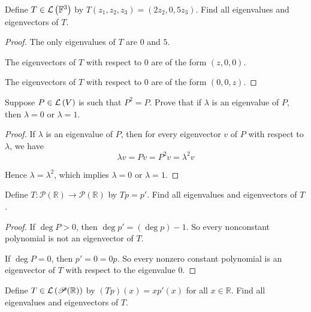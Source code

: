 \begin{exercise}
    Define $T\in\mathcal{L}\left({\mathbb{F}^{3}}\right)$ by $T(z_{1}, z_{2}, z_{3}) = (2z_{2}, 0, 5z_{3})$. Find all eigenvalues and eigenvectors of $T$.
\end{exercise}

\begin{proof}
    The only eigenvalues of $T$ are $0$ and $5$.

    The eigenvectors of $T$ with respect to $0$ are of the form $(z, 0, 0)$.

    The eigenvectors of $T$ with respect to $0$ are of the form $(0, 0, z)$.
\end{proof}
\newpage

\begin{exercise}
    Suppose $P\in\mathcal{L}\left({V}\right)$ is such that $P^{2} = P$. Prove that if $\lambda$ is an eigenvalue of $P$, then $\lambda = 0$ or $\lambda = 1$.
\end{exercise}

\begin{proof}
    If $\lambda$ is an eigenvalue of $P$, then for every eigenvector $v$ of $P$ with respect to $\lambda$, we have
    \[
        \lambda v = Pv = P^{2}v = \lambda^{2}v
    \]

    Hence $\lambda = \lambda^{2}$, which implies $\lambda = 0$ or $\lambda = 1$.
\end{proof}
\newpage

\begin{exercise}
    Define $T: \mathscr{P}(\mathbb{R})\to \mathscr{P}(\mathbb{R})$ by $Tp = p'$. Find all eigenvalues and eigenvectors of $T$.
\end{exercise}

\begin{proof}
    If $\deg P > 0$, then $\deg p' = (\deg p) - 1$. So every nonconstant polynomial is not an eigenvector of $T$.

    If $\deg P = 0$, then $p' = 0 = 0p$. So every nonzero constant polynomial is an eigenvector of $T$ with respect to the eigenvalue $0$.
\end{proof}
\newpage

\begin{exercise}
    Define $T\in\mathcal{L}\left({\mathscr{P}(\mathbb{R})}\right)$ by $(Tp)(x) = xp'(x)$ for all $x\in \mathbb{R}$. Find all eigenvalues and eigenvectors of $T$.
\end{exercise}

